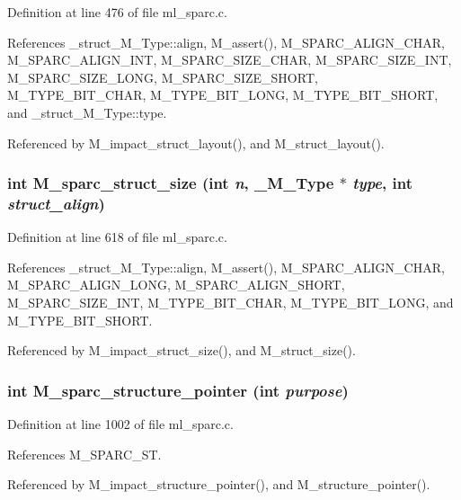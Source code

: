 Definition at line 476 of file ml\_\-sparc.c.

References \_\-struct\_\-M\_\-Type::align, M\_\-assert(), M\_\-SPARC\_\-ALIGN\_\-CHAR, M\_\-SPARC\_\-ALIGN\_\-INT, M\_\-SPARC\_\-SIZE\_\-CHAR, M\_\-SPARC\_\-SIZE\_\-INT, M\_\-SPARC\_\-SIZE\_\-LONG, M\_\-SPARC\_\-SIZE\_\-SHORT, M\_\-TYPE\_\-BIT\_\-CHAR, M\_\-TYPE\_\-BIT\_\-LONG, M\_\-TYPE\_\-BIT\_\-SHORT, and \_\-struct\_\-M\_\-Type::type.

Referenced by M\_\-impact\_\-struct\_\-layout(), and M\_\-struct\_\-layout().
\subsubsection{\setlength{\rightskip}{0pt plus 5cm}int M\_\-sparc\_\-struct\_\-size (int {\em n}, \bf{\_\-M\_\-Type} $\ast$ {\em type}, int {\em struct\_\-align})}\label{m__sparc_8h_62f8aebcd3384c1c9136d36790ce4352}




Definition at line 618 of file ml\_\-sparc.c.

References \_\-struct\_\-M\_\-Type::align, M\_\-assert(), M\_\-SPARC\_\-ALIGN\_\-CHAR, M\_\-SPARC\_\-ALIGN\_\-LONG, M\_\-SPARC\_\-ALIGN\_\-SHORT, M\_\-SPARC\_\-SIZE\_\-INT, M\_\-TYPE\_\-BIT\_\-CHAR, M\_\-TYPE\_\-BIT\_\-LONG, and M\_\-TYPE\_\-BIT\_\-SHORT.

Referenced by M\_\-impact\_\-struct\_\-size(), and M\_\-struct\_\-size().
\subsubsection{\setlength{\rightskip}{0pt plus 5cm}int M\_\-sparc\_\-structure\_\-pointer (int {\em purpose})}\label{m__sparc_8h_625b80affb153f5aede9829e5ca16d90}




Definition at line 1002 of file ml\_\-sparc.c.

References M\_\-SPARC\_\-ST.

Referenced by M\_\-impact\_\-structure\_\-pointer(), and M\_\-structure\_\-pointer().
